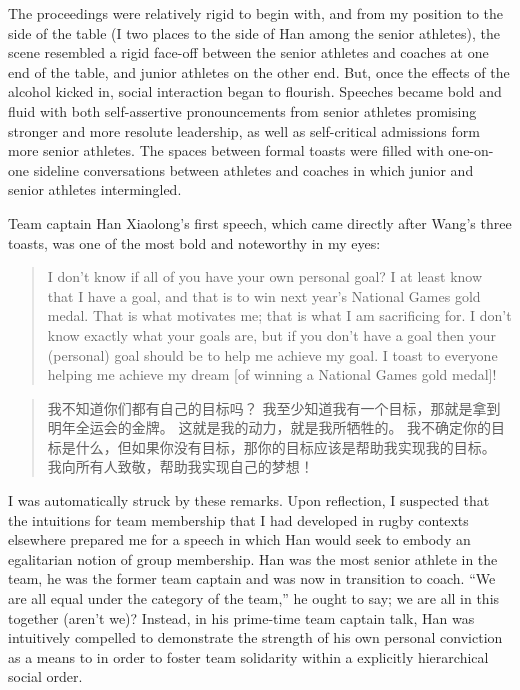 \begin{CJK}{UTF8}{gbsn}
  The proceedings were relatively rigid to begin with, and from my position to the side of the table (I two places to the side of Han among the senior athletes), the scene resembled a rigid face-off between the senior athletes and coaches at one end of the table, and junior athletes on the other end.  But, once the effects of the alcohol kicked in, social interaction began to flourish.  Speeches became bold and fluid with both self-assertive pronouncements from senior athletes promising stronger and more resolute leadership, as well as self-critical admissions form more senior athletes. The spaces between formal toasts were filled with one-on-one sideline conversations between athletes and coaches in which junior and senior athletes intermingled.

  Team captain Han Xiaolong's first speech, which came directly after Wang's three toasts, was one of the most bold and noteworthy in my eyes:

       \begin{quote}
         I don't know if all of you have your own personal goal?  I at least know that I have a goal, and that is to win next year's National Games gold medal.  That is what motivates me; that is what I am sacrificing for.  I don't know exactly what your goals are, but if you don't have a goal then your (personal) goal should be to help me achieve my goal.  I toast to everyone helping me achieve my dream [of winning a National Games gold medal]!
       \end{quote}
       \begin{quote}
           我不知道你们都有自己的目标吗？ 我至少知道我有一个目标，那就是拿到明年全运会的金牌。 这就是我的动力，就是我所牺牲的。 我不确定你的目标是什么，但如果你没有目标，那你的目标应该是帮助我实现我的目标。 我向所有人致敬，帮助我实现自己的梦想！
       \end{quote}

  I was automatically struck by these remarks.  Upon reflection, I suspected that the intuitions for team membership that I had developed in rugby contexts elsewhere prepared me for a speech in which Han would seek to embody an egalitarian notion of group membership. Han was the most senior athlete in the team, he was the former team captain and was now in transition to coach.  ``We are all equal under the category of the team,'' he ought to say; we are all in this together (aren't we)?  Instead, in his prime-time team captain talk, Han was intuitively compelled to demonstrate the strength of his own personal conviction as a means to in order to foster team solidarity within a explicitly hierarchical social order.





\end{CJK}
